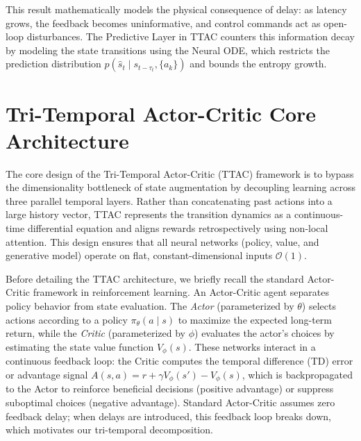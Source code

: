 \documentclass[manuscript, screen, review]{jair}
\begin{document}
This result mathematically models the physical consequence of delay: as latency grows, the feedback becomes uninformative, and control commands act as open-loop disturbances. The Predictive Layer in TTAC counters this information decay by modeling the state transitions using the Neural ODE, which restricts the prediction distribution $p(\hat{s}_t \mid s_{t-\tau_t}, \{a_{k}\})$ and bounds the entropy growth.

\section{Tri-Temporal Actor-Critic Core Architecture}
The core design of the Tri-Temporal Actor-Critic (TTAC) framework is to bypass the dimensionality bottleneck of state augmentation by decoupling learning across three parallel temporal layers. Rather than concatenating past actions into a large history vector, TTAC represents the transition dynamics as a continuous-time differential equation and aligns rewards retrospectively using non-local attention. This design ensures that all neural networks (policy, value, and generative model) operate on flat, constant-dimensional inputs $\mathcal{O}(1)$.

Before detailing the TTAC architecture, we briefly recall the standard Actor-Critic framework in reinforcement learning. An Actor-Critic agent separates policy behavior from state evaluation. The \textit{Actor} (parameterized by $\theta$) selects actions according to a policy $\pi_\theta(a \mid s)$ to maximize the expected long-term return, while the \textit{Critic} (parameterized by $\phi$) evaluates the actor's choices by estimating the state value function $V_\phi(s)$. These networks interact in a continuous feedback loop: the Critic computes the temporal difference (TD) error or advantage signal $A(s, a) = r + \gamma V_\phi(s') - V_\phi(s)$, which is backpropagated to the Actor to reinforce beneficial decisions (positive advantage) or suppress suboptimal choices (negative advantage). Standard Actor-Critic assumes zero feedback delay; when delays are introduced, this feedback loop breaks down, which motivates our tri-temporal decomposition.
\end{document}
